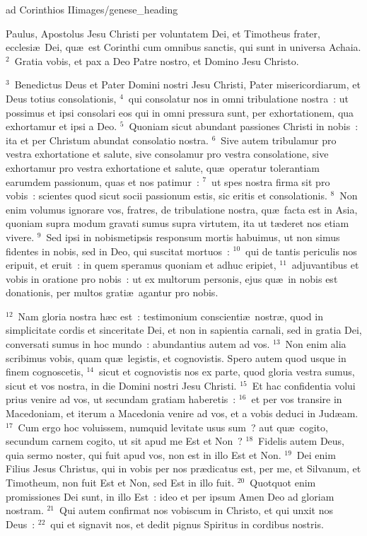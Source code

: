 {ad Corinthios II}{images/genese_heading}


\bchapter
\lettrine[lines=6,image=true,loversize=0.05,lraise=-0.03]{P}{}aulus, Apostolus Jesu Christi per voluntatem Dei, et Timotheus frater, ecclesi\ae\ Dei, qu\ae\ est Corinthi cum omnibus sanctis, qui sunt in universa Achaia.
${}^{2}$~Gratia vobis, et pax a Deo Patre nostro, et Domino Jesu Christo.


${}^{3}$~Benedictus Deus et Pater Domini nostri Jesu Christi, Pater misericordiarum, et Deus totius consolationis,
${}^{4}$~qui consolatur nos in omni tribulatione nostra~: ut possimus et ipsi consolari eos qui in omni pressura sunt, per exhortationem, qua exhortamur et ipsi a Deo.
${}^{5}$~Quoniam sicut abundant passiones Christi in nobis~: ita et per Christum abundat consolatio nostra.
${}^{6}$~Sive autem tribulamur pro vestra exhortatione et salute, sive consolamur pro vestra consolatione, sive exhortamur pro vestra exhortatione et salute, qu\ae\ operatur tolerantiam earumdem passionum, quas et nos patimur~:
${}^{7}$~ut spes nostra firma sit pro vobis~: scientes quod sicut socii passionum estis, sic eritis et consolationis.
${}^{8}$~Non enim volumus ignorare vos, fratres, de tribulatione nostra, qu\ae\ facta est in Asia, quoniam supra modum gravati sumus supra virtutem, ita ut t\ae deret nos etiam vivere.
${}^{9}$~Sed ipsi in nobismetipsis responsum mortis habuimus, ut non simus fidentes in nobis, sed in Deo, qui suscitat mortuos~:
${}^{10}$~qui de tantis periculis nos eripuit, et eruit~: in quem speramus quoniam et adhuc eripiet,
${}^{11}$~adjuvantibus et vobis in oratione pro nobis~: ut ex multorum personis, ejus qu\ae\ in nobis est donationis, per multos grati\ae\ agantur pro nobis.


${}^{12}$~Nam gloria nostra h\ae c est~: testimonium conscienti\ae\ nostr\ae , quod in simplicitate cordis et sinceritate Dei, et non in sapientia carnali, sed in gratia Dei, conversati sumus in hoc mundo~: abundantius autem ad vos.
${}^{13}$~Non enim alia scribimus vobis, quam qu\ae\ legistis, et cognovistis. Spero autem quod usque in finem cognoscetis,
${}^{14}$~sicut et cognovistis nos ex parte, quod gloria vestra sumus, sicut et vos nostra, in die Domini nostri Jesu Christi.
${}^{15}$~Et hac confidentia volui prius venire ad vos, ut secundam gratiam haberetis~:
${}^{16}$~et per vos transire in Macedoniam, et iterum a Macedonia venire ad vos, et a vobis deduci in Jud\ae am.
${}^{17}$~Cum ergo hoc voluissem, numquid levitate usus sum~? aut qu\ae\ cogito, secundum carnem cogito, ut sit apud me Est et Non~?
${}^{18}$~Fidelis autem Deus, quia sermo noster, qui fuit apud vos, non est in illo Est et Non.
${}^{19}$~Dei enim Filius Jesus Christus, qui in vobis per nos pr\ae dicatus est, per me, et Silvanum, et Timotheum, non fuit Est et Non, sed Est in illo fuit.
${}^{20}$~Quotquot enim promissiones Dei sunt, in illo Est~: ideo et per ipsum Amen Deo ad gloriam nostram.
${}^{21}$~Qui autem confirmat nos vobiscum in Christo, et qui unxit nos Deus~:
${}^{22}$~qui et signavit nos, et dedit pignus Spiritus in cordibus nostris.



